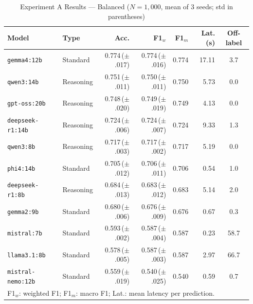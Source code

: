 \documentclass[10pt,a4paper,twocolumn]{article}
\begin{document}
\begin{table}[!t]
  \renewcommand{\arraystretch}{1.2}
  \caption{Experiment A Results --- Balanced ($N = 1{,}000$, mean of 3 seeds; std in parentheses)}
  \label{tab:results_balanced}
  \centering
  \footnotesize
  \setlength{\tabcolsep}{4pt}
  \begin{tabular}{@{}llrrrrc@{}}
    \toprule
    \textbf{Model} & \textbf{Type} & \textbf{Acc.} & \textbf{F1$_w$} & \textbf{F1$_m$} & \textbf{Lat.(s)} & \textbf{Off-label} \\
    \midrule
    \texttt{gemma4:12b}       & Standard  & 0.774\,({\footnotesize$\pm$.017}) & 0.774\,({\footnotesize$\pm$.016}) & 0.774 & 17.11 & 3.7 \\
    \texttt{qwen3:14b}        & Reasoning & 0.751\,({\footnotesize$\pm$.011}) & 0.750\,({\footnotesize$\pm$.011}) & 0.750 &  5.73 & 0.0 \\
    \texttt{gpt-oss:20b}      & Reasoning & 0.748\,({\footnotesize$\pm$.020}) & 0.749\,({\footnotesize$\pm$.019}) & 0.749 &  4.13 & 0.0 \\
    \texttt{deepseek-r1:14b}  & Reasoning & 0.724\,({\footnotesize$\pm$.006}) & 0.724\,({\footnotesize$\pm$.007}) & 0.724 &  9.33 & 1.3 \\
    \texttt{qwen3:8b}         & Reasoning & 0.717\,({\footnotesize$\pm$.003}) & 0.717\,({\footnotesize$\pm$.002}) & 0.717 &  5.19 & 0.0 \\
    \texttt{phi4:14b}         & Standard  & 0.705\,({\footnotesize$\pm$.012}) & 0.706\,({\footnotesize$\pm$.011}) & 0.706 &  0.54 & 1.0 \\
    \texttt{deepseek-r1:8b}   & Reasoning & 0.684\,({\footnotesize$\pm$.013}) & 0.683\,({\footnotesize$\pm$.012}) & 0.683 &  5.14 & 2.0 \\
    \texttt{gemma2:9b}        & Standard  & 0.680\,({\footnotesize$\pm$.006}) & 0.676\,({\footnotesize$\pm$.009}) & 0.676 &  0.67 & 0.3 \\
    \texttt{mistral:7b}       & Standard  & 0.593\,({\footnotesize$\pm$.002}) & 0.587\,({\footnotesize$\pm$.004}) & 0.587 &  0.23 & 58.7 \\
    \texttt{llama3.1:8b}      & Standard  & 0.578\,({\footnotesize$\pm$.005}) & 0.587\,({\footnotesize$\pm$.003}) & 0.587 &  2.97 & 66.7 \\
    \texttt{mistral-nemo:12b} & Standard  & 0.559\,({\footnotesize$\pm$.019}) & 0.540\,({\footnotesize$\pm$.025}) & 0.540 &  0.59 & 0.7 \\
    \bottomrule
    \multicolumn{7}{l}{\footnotesize F1$_w$: weighted F1; F1$_m$: macro F1; Lat.: mean latency per prediction.}
  \end{tabular}
\end{table}
\end{document}
